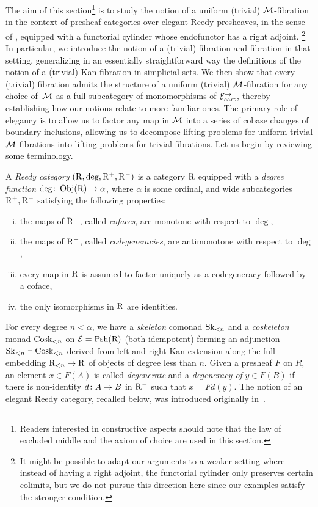 \documentclass[reqno,10pt,a4paper,oneside,draft]{amsart}
\begin{document}
The aim of this section\footnote{Readers interested in constructive aspects should note that  the law of excluded middle and the axiom of choice are used in this section.} is to study the notion of a uniform (trivial) $\cal{M}$-fibration in the context of presheaf categories over elegant Reedy presheaves, in the sense of \cite{bergner-rezk-elegant}, equipped with a functorial cylinder whose endofunctor has a right adjoint.%
\footnote{It might be possible to adapt our arguments to a weaker setting where instead of having a right adjoint, the functorial cylinder only preserves certain colimits, but we do not pursue this direction here since our examples satisfy the stronger condition.}
In particular, we introduce the notion of a (trivial) fibration and fibration in that setting,  generalizing in an
essentially straightforward way the definitions of the notion of a (trivial) Kan fibration in simplicial sets.
We then show that every (trivial) fibration admits the structure of a uniform (trivial) $\cal{M}$-fibration for any choice of~$\cal{M}$ as a full subcategory of monomorphisms of $\cal{E}_{\cart}^\to$, thereby establishing how our notions relate to more familiar ones.
The primary role of elegancy is to allow us to factor any map in $\cal{M}$ into a series of cobase changes of boundary inclusions, allowing us to decompose lifting problems for uniform trivial $\cal{M}$-fibrations into lifting problems for trivial fibrations. Let us begin by reviewing some terminology.

\begin{definition} A \emph{Reedy category} $(\R, \deg, \Rp, \Rm)$ is a category $\R$ equipped with a \emph{degree function} $\deg \co \obj(\R) \to \alpha$, where $\alpha$ is some ordinal, and wide subcategories $\Rp, \Rm$ satisfying the following properties:
\begin{enumerate}[(i)]
\item the maps of $\Rp$, called \emph{cofaces}, are monotone with respect to $\deg$,
\item the maps of $\Rm$, called \emph{codegeneracies}, are antimonotone with respect to $\deg$,
\item every map in $\R$ is assumed to factor uniquely as a codegeneracy followed by a coface,
\item the only isomorphisms in $\R$ are identities.
\end{enumerate}
\end{definition}

For every degree $n < \alpha$, we have a \emph{skeleton} comonad $\Sk_{<n}$ and a \emph{coskeleton} monad $\Cosk_{<n}$ on $\catE = \Psh(\R)$ (both idempotent) forming an adjunction $\Sk_{<n} \dashv \Cosk_{<n}$ derived from left and right Kan extension along the full embedding $\R_{<n} \to \R$ of objects of degree less than $n$.
Given a presheaf $F$ on $R$, an element $x \in F(A)$ is called \emph{degenerate} and a \emph{degeneracy of} $y \in F(B)$ if there is non-identity $d \co A \to B$ in $\Rm$ such that $x = Fd(y)$. The notion of an elegant Reedy category,
recalled below, was introduced originally in~\cite{bergner-rezk-elegant}.
\end{document}
